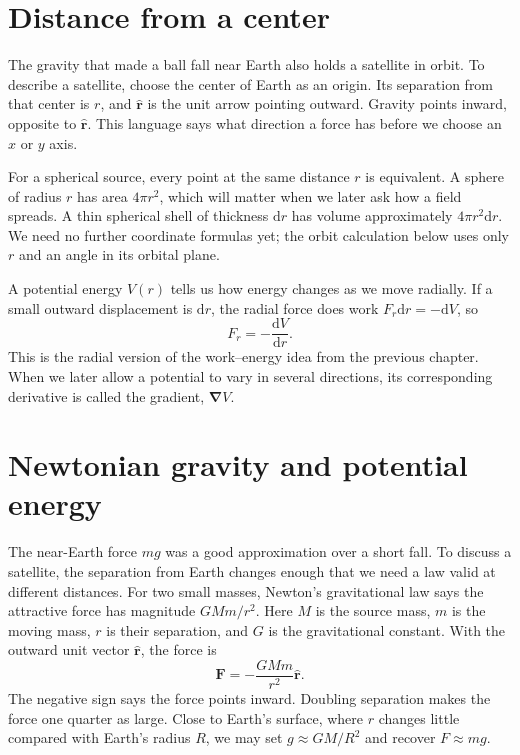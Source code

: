 \documentclass[11pt,oneside]{book}
\newcommand{\dd}{\mathrm{d}}
\newcommand{\vect}[1]{\boldsymbol{#1}}
\newcommand{\grad}{\boldsymbol{\nabla}}
\newcommand{\od}[2]{\frac{\dd #1}{\dd #2}}
\theoremstyle{reviewstyle}
\begin{document}
\section{Distance from a center}
The gravity that made a ball fall near Earth also holds a satellite in orbit. To describe a satellite, choose the center of Earth as an origin. Its separation from that center is $r$, and $\hat{\vect r}$ is the unit arrow pointing outward. Gravity points inward, opposite to $\hat{\vect r}$. This language says what direction a force has before we choose an $x$ or $y$ axis.

For a spherical source, every point at the same distance $r$ is equivalent. A sphere of radius $r$ has area $4\pi r^2$, which will matter when we later ask how a field spreads. A thin spherical shell of thickness $\dd r$ has volume approximately $4\pi r^2\dd r$. We need no further coordinate formulas yet; the orbit calculation below uses only $r$ and an angle in its orbital plane.

A potential energy $V(r)$ tells us how energy changes as we move radially. If a small outward displacement is $\dd r$, the radial force does work $F_r\dd r=-\dd V$, so
\begin{equation}
F_r=-\od{V}{r}.
\end{equation}
This is the radial version of the work--energy idea from the previous chapter. When we later allow a potential to vary in several directions, its corresponding derivative is called the gradient, $\grad V$.

\section{Newtonian gravity and potential energy}
The near-Earth force $mg$ was a good approximation over a short fall. To discuss a satellite, the separation from Earth changes enough that we need a law valid at different distances. For two small masses, Newton's gravitational law says the attractive force has magnitude $GMm/r^2$. Here $M$ is the source mass, $m$ is the moving mass, $r$ is their separation, and $G$ is the gravitational constant. With the outward unit vector $\hat{\vect r}$, the force is
\begin{equation}
\vect F=-\frac{GMm}{r^2}\hat{\vect r}.
\end{equation}
The negative sign says the force points inward. Doubling separation makes the force one quarter as large. Close to Earth's surface, where $r$ changes little compared with Earth's radius $R$, we may set $g\approx GM/R^2$ and recover $F\approx mg$.
\end{document}
